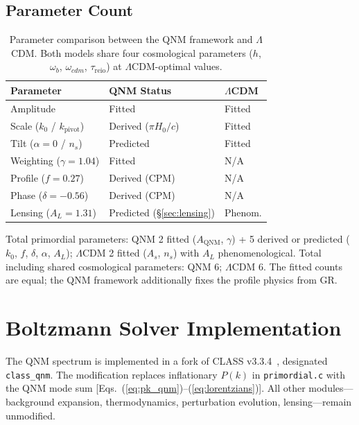\documentclass[aps,prd,twocolumn,superscriptaddress,showpacs,preprintnumbers,amsmath,amssymb,nofootinbib]{revtex4-2}
\newcommand{\lcdm}{$\Lambda$CDM}
\begin{document}
\subsection{Parameter Count}
\label{sec:params}

\begin{table}[t]
	\caption{Parameter comparison between the QNM framework and $\Lambda$CDM. Both models share four cosmological parameters ($h$, $\omega_b$, $\omega_{cdm}$, $\tau_\mathrm{reio}$) at $\Lambda$CDM-optimal values.}
	\label{tab:params}
	\begin{ruledtabular}
		\begin{tabular}{lll}
			Parameter & QNM Status & $\Lambda$CDM \\
			\hline
			Amplitude & Fitted & Fitted \\
			Scale ($k_0$ / $k_\mathrm{pivot}$) & Derived ($\pi H_0/c$) & Fitted \\
			Tilt ($\alpha=0$ / $n_s$) & Predicted & Fitted \\
			Weighting ($\gamma=1.04$) & Fitted\footnotemark[1] & N/A \\
			Profile ($f=0.27$) & Derived (CPM) & N/A \\
			Phase ($\delta=-0.56$) & Derived (CPM) & N/A \\
			Lensing ($A_L=1.31$) & Predicted (\S\ref{sec:lensing}) & Phenom. \\
		\end{tabular}
	\end{ruledtabular}
\end{table}

Total primordial parameters: QNM 2 fitted ($A_\mathrm{QNM}$, $\gamma$) + 5 derived or predicted ($k_0$, $f$, $\delta$, $\alpha$, $A_L$); \lcdm{} 2 fitted ($A_s$, $n_s$) with $A_L$ phenomenological. Total including shared cosmological parameters: QNM 6; \lcdm{} 6. The fitted counts are equal; the QNM framework additionally fixes the profile physics from GR.


\section{Boltzmann Solver Implementation}
\label{sec:class}

The QNM spectrum is implemented in a fork of CLASS v3.3.4~\cite{Blas2011}, designated \texttt{class\_qnm}. The modification replaces inflationary $P(k)$ in \texttt{primordial.c} with the QNM mode sum [Eqs.~(\ref{eq:pk_qnm})--(\ref{eq:lorentzians})]. All other modules---background expansion, thermodynamics, perturbation evolution, lensing---remain unmodified.
\end{document}

